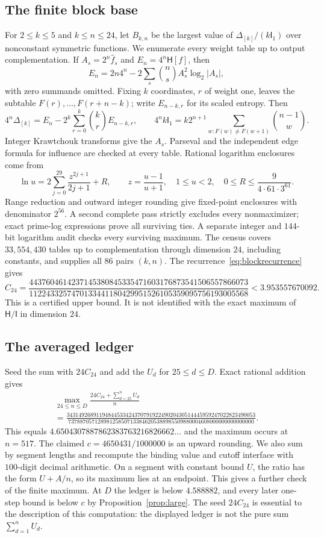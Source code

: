 \documentclass[11pt]{amsart}
\theoremstyle{definition}
\theoremstyle{remark}
\newcommand{\HH}{\mathsf H}
\newcommand{\I}{\mathsf I}
\newcommand{\wh}[1]{\widehat{#1}}
\begin{document}
\subsection*{The finite block base}
For $2\le k\le5$ and $k\le n\le24$, let $B_{k,n}$ be the largest value of $\Delta_{[k]}/(k\I_1)$ over nonconstant symmetric functions. We enumerate every weight table up to output complementation. If $A_s=2^n\wh f_s$ and $E_n=4^n\HH[f]$, then
\[
 E_n=2n4^n-2\sum_s\binom ns A_s^2\log_2|A_s|,
\]
with zero summands omitted. Fixing $k$ coordinates, $r$ of weight one, leaves the subtable $F(r),\ldots,F(r+n-k)$; write $E_{n-k,r}$ for its scaled entropy. Then
\[
 4^n\Delta_{[k]}=E_n-2^k\sum_{r=0}^k\binom kr E_{n-k,r},\qquad
 4^nk\I_1=k2^{n+1}\sum_{w:F(w)\ne F(w+1)}\binom{n-1}w.
\]
Integer Krawtchouk transforms give the $A_s$. Parseval and the independent edge formula for influence are checked at every table. Rational logarithm enclosures come from
\[
 \ln u=2\sum_{j=0}^{29}\frac{z^{2j+1}}{2j+1}+R,\qquad
 z=\frac{u-1}{u+1},\quad 1\le u<2,\quad
 0\le R\le\frac{9}{4\cdot61\cdot3^{61}}.
\]
Range reduction and outward integer rounding give fixed-point enclosures with denominator $2^{56}$. A second complete pass strictly excludes every nonmaximizer; exact prime-log expressions prove all surviving ties. A separate integer and $144$-bit logarithm audit checks every surviving maximum. The census covers $33{,}554{,}430$ tables up to complementation through dimension $24$, including constants, and supplies all $86$ pairs $(k,n)$. The recurrence~\eqref{eq:blockrecurrence} gives
\[
 C_{24}=\frac{4437604614237145380845335471603176873541506557866073}
 {1122433257470133441180429951526105359095756193005568}
 <3.953557670092.
\]
This is a certified upper bound. It is not identified with the exact maximum of $\HH/\I$ in dimension $24$.

\subsection*{The averaged ledger}
Seed the sum with $24C_{24}$ and add the $U_d$ for $25\le d\le D$. Exact rational addition gives
\[
 \begin{gathered}
 \max_{24\le n\le D}\frac{24C_{24}+\sum_{d=25}^nU_d}{n}\\
 =\frac{3431492689119484453342437079192249020430514445959247022823490053}
 {737887057128981258507133846205388985509880004608000000000000000}.
 \end{gathered}
\]
This equals $4.6504307887862383763216826662\ldots$ and the maximum occurs at $n=517$. The claimed $c=4650431/1000000$ is an upward rounding. We also sum by segment lengths and recompute the binding value and cutoff interface with $100$-digit decimal arithmetic. On a segment with constant bound $U$, the ratio has the form $U+A/n$, so its maximum lies at an endpoint. This gives a further check of the finite maximum. At $D$ the ledger is below $4.588882$, and every later one-step bound is below $c$ by Proposition~\ref{prop:large}. The seed $24C_{24}$ is essential to the description of this computation: the displayed ledger is not the pure sum $\sum_{d=1}^nU_d$.
\end{document}
